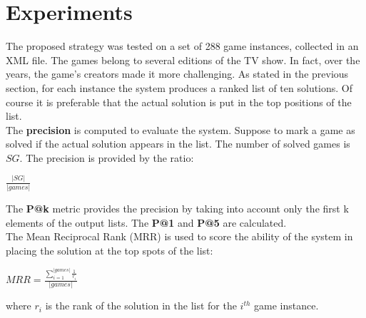 \documentclass[twoside,twocolumn]{article}
\begin{document}
\section{Experiments}
	The proposed strategy was tested on a set of 288 game instances, collected in an XML file. The games belong to several editions of the TV show. In fact, over the years, the game's creators made it more challenging. As stated in the previous section, for each instance the system produces a ranked list of ten solutions. Of course it is preferable that the actual solution is put in the top positions of the list. \\
	The \textbf{precision} is computed to evaluate the system. Suppose to mark a game as solved if the actual solution appears in the list. The number of solved games is $SG$. The precision is provided by the ratio: 
	\begin{center}
	\LARGE $\frac{|SG|}{|games|}$ \\
	\end{center}	
	The \textbf{P@k} metric provides the precision by taking into account only the first k elements of the output lists. The \textbf{P@1} and \textbf{P@5} are calculated. \\
	The Mean Reciprocal Rank (MRR) is used to score the ability of the system in placing the solution at the top spots of the list:
	\begin{center}
	\Large$MRR = \frac{\sum_{i = 1}^{|games|} \frac{1}{r_i}}{|games|}$ \\
	\end{center}
	where $r_i$ is the rank of the solution in the list for the $i^{th}$ game instance.
\end{document}

